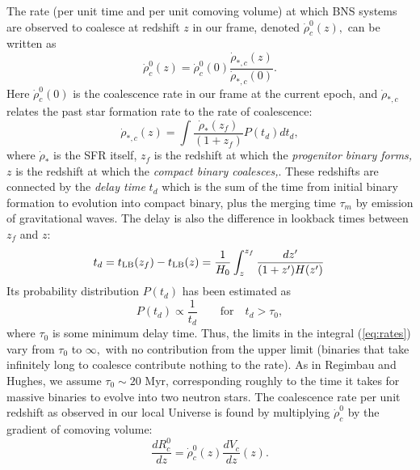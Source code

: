 The rate (per unit time and per unit comoving volume) at which 
BNS systems are observed to coalesce at redshift $z$ in our frame, 
denoted $\dot\rho^0_c(z),$ can be written as \cite{Regimbau:2009} 
\begin{equation}
\dot{\rho}^0_c(z) = \dot{\rho}^0_c(0) 
\frac{\dot{\rho}_{\ast,c}(z)}{\dot{\rho}_{\ast,c}(0)}.
\label{eq:rates}
\end{equation}
Here $\dot{\rho}^0_c(0)$ is the coalescence rate in our frame at the 
current epoch, and $\dot{\rho}_{\ast,c}$ relates the past star 
formation rate to the rate of coalescence:
\begin{equation}
\dot{\rho}_{\ast,c}(z) = \int \frac{\dot{\rho}_\ast(z_f)}{(1+z_f)} P(t_d) dt_d,
\end{equation}
where $\dot{\rho}_\ast$ is the SFR itself, $z_f$ is the redshift at 
which the {\em progenitor binary forms,} $z$ is the redshift at which the 
{\em compact binary coalesces,}. These redshifts are connected by the {\em delay time}  $t_d$ which is the sum of the time from initial binary
formation to evolution into compact binary, plus the merging time
$\tau_m$ by emission of gravitational waves.  The delay is also the
difference in lookback times between $z_f$ and $z$:
\begin{equation}
t_d = t_{\rm LB}(z_f) - t_{\rm LB}(z) = \frac{1}{H_0}
\int_z^{z_f} \frac{dz'}{(1 + z')H( z')}\,
\end{equation}
Its probability distribution $P(t_d)$  has been estimated as
\begin{equation}
P(t_d) \propto \frac{1}{t_d}\qquad \mbox{for}\quad t_d > \tau_0,
\end{equation}
where $\tau_0$ is some minimum delay time. 
Thus, the limits in the integral
(\ref{eq:rates}) vary from $\tau_0$ to $\infty,$ with no contribution from
the upper limit (binaries that take infinitely long to coalesce contribute
nothing to the rate).  As in Regimbau and Hughes, \cite{Regimbau:2009} we 
assume $\tau_0 \sim 20$ Myr,  corresponding roughly to the time it takes for massive binaries to evolve into two neutron stars.
The coalescence rate per unit redshift as 
observed in our local Universe is found by multiplying 
$\dot{\rho}^0_c$ by the gradient of comoving volume:
\begin{equation}
\frac{dR^0_c}{dz} = \dot{\rho}^0_c(z) \frac{dV_c}{dz}(z).
\end{equation}


